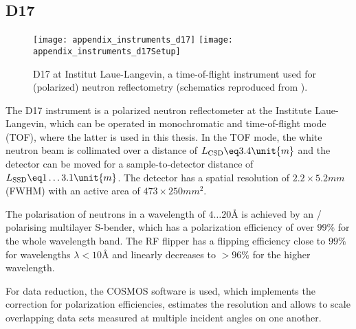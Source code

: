 \documentclass[\main/dresen_thesis.tex]{subfiles}
\begin{document}
  \subsection{D17}\label{ch:lss:d17}

    \begin{figure}[ht]
      \centering
      \texttt{[image: appendix\_instruments\_d17]}
      \texttt{[image: appendix\_instruments\_d17Setup]}
      \caption{\label{fig:lss:d17}D17 at Institut Laue-Langevin, a time-of-flight instrument used for (polarized) neutron reflectometry (schematics reproduced from \cite{Saerbeck_2018_Recen}).}
    \end{figure}
    The D17 instrument \cite{Saerbeck_2018_Recen} is a polarized neutron reflectometer at the Institute Laue-Langevin, which can be operated in monochromatic and time-of-flight mode (TOF), where the latter is used in this thesis.
    In the TOF mode, the white neutron beam is collimated over a distance of $L_\mathrm{CSD} \eq 3.4 \unit{m}$ and the detector can be moved for a sample-to-detector distance of $L_\mathrm{SSD} \eq 1 \ldots 3.1 \unit{m}$.
    The detector has a spatial resolution of $2.2 \times 5.2 \unit{mm}$ (FWHM) with an active area of $473 \times 250 \unit{mm^2}$.

    The polarisation of neutrons in a wavelength of $4 \ldots 20 \unit{\angstrom}$ is achieved by an / polarising multilayer S-bender, which has a polarization efficiency of over $99 \unit{\%}$ for the whole wavelength band.
    The RF flipper has a flipping efficiency close to $99 \unit{\%}$ for wavelengths $\lambda < 10 \unit{\angstrom}$ and linearly decreases to $>96 \%$ for the higher wavelength.

    For data reduction, the COSMOS software \cite{Gutfreund_2018_Towar} is used, which implements the correction for polarization efficiencies, estimates the resolution and allows to scale overlapping data sets measured at multiple incident angles on one another.
\end{document}
